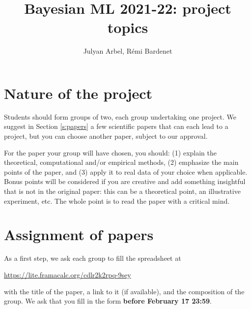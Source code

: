 \documentclass[12pt]{article}%
\date{}
\begin{document}
\title{Bayesian ML 2021-22: project topics}
\author{Julyan Arbel, R\'emi Bardenet}
\maketitle

\section{Nature of the project}
Students should form groups of two, each group undertaking one project. We suggest in Section \ref{s:papers} a few scientific papers that can each lead to a project, but you can choose another paper, subject to our approval.

For the paper your group will have chosen, you should: (1) explain the theoretical, computational and/or empirical methods, (2) emphasize the main points of the paper, and (3) apply it to real data of your choice when applicable. Bonus points will be considered if you are creative and add something insightful that is not in the original paper: this can be a theoretical point, an illustrative experiment, etc. The whole point is to read the paper with a critical mind.

\section{Assignment of papers}
As a first step, we ask each group to fill the spreadsheet at
\begin{center}
   \href{https://lite.framacalc.org/cdlr2k2rpq-9sey}{https://lite.framacalc.org/cdlr2k2rpq-9sey}
 \end{center}
with the title of the paper, a link to it (if available), and the composition of the group.
We ask that you fill in the form {\bf before February 17 23:59}. 
\end{document}
